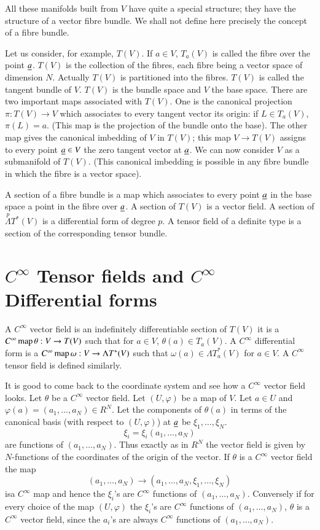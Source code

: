 All these manifolds built from $V$ have quite a special structure;
they have the structure of a vector fibre bundle. We shall not define
here precisely the concept of a fibre bundle.

Let us consider, for example, $T(V)$. If $a\in V$, $T_{a}(V)$ is
called the fibre over the point $\underline{a}$. $T(V)$ is the collection of
the fibres, each fibre being a vector space of dimension $N$. Actually
$T(V)$ is partitioned into the fibres. $T(V)$ is called the tangent
bundle of $V$. $T(V)$ is the bundle space and $V$ the base
space. There are two important maps associated with $T(V)$. One is the
canonical projection $\pi:T(V)\to V$ which associates to every tangent
vector its origin: if $L\in T_{a}(V)$, $\pi(L)=a$. (This map is the
projection of the bundle onto the base). The other map gives the
canonical imbedding of $V$ in $T(V)$; this map $V\to T(V)$ assigns to
every point $\underline{a}\in V$ the zero tangent vector at $\underline{a}$. We can
now consider $V$ as a submanifold of $T(V)$. (This\pageoriginale
canonical imbedding 
is possible in any fibre bundle in which the fibre is a vector space).

A section of a fibre bundle is a map which associates to every point
$\underline{a}$ in the base space a point in the fibre over $\underline{a}$. A
section of $T(V)$ is a vector field. A section of
$\overset{p}{\Lambda}T^{\ast}(V)$ is a differential form of degree
$p$. A tensor field of a definite type is a section of the
corresponding tensor bundle.

\section*{$C^{\infty}$ Tensor fields and $C^{\infty}$ Differential
  forms}

A $C^{\infty}$ vector field is an indefinitely differentiable section
of $T(V)$ \ie it is a $C^{\infty}\operatorname{map} \theta:V\to T(V)$ such that for
$a\in V$, $\theta(a)\in T_{a}(V)$. A $C^{\infty}$ differential form is
a $C^{\infty}\operatorname{map} \omega:V\to \Lambda T^{\ast}(V)$ such that
$\omega(a)\in \Lambda T^{\ast}_{a}(V)$ for $a\in V$. A $C^{\infty}$
tensor field is defined similarly.

It is good to come back to the coordinate system and see how a
$C^{\infty}$ vector field looks. Let $\theta$ be a $C^{\infty}$ vector
field. Let $(U,\varphi)$ be a map of $V$. Let $a\in U$ and
$\varphi(a)=(a_{1},\ldots,a_{N})\in R^{N}$. Let the components of
$\theta(a)$ in terms of the canonical basis (with respect to
$(U,\varphi)$) at $\underline{a}$ be $\xi_{1},\ldots,\xi_{N}$.
$$
\xi_{i}=\xi_{i}(a_{1},\ldots,a_{N})
$$
are functions of $(a_{1},\ldots,a_{N})$. Thus exactly as in $R^{N}$
the vector field is given by $N$-functions of the coordinates of the
origin of the vector. If $\theta$ is a $C^{\infty}$ vector field the
map
$$
(a_{1},\ldots,a_{N})\to (a_{1},\ldots,a_{N},\xi_{1},\ldots,\xi_{N})
$$
is\pageoriginale a $C^{\infty}$ map and hence the $\xi_{i}$'s are $C^{\infty}$
functions of $(a_{1},\ldots,a_{N})$. Conversely if for every choice of
the map $(U,\varphi)$ the $\xi_{i}$'s are $C^{\infty}$ functions of
$(a_{1},\ldots,a_{N})$, $\theta$ is a $C^{\infty}$ vector field, since
the $a_{i}$'s are always $C^{\infty}$ functions of
$(a_{1},\ldots,a_{N})$.

